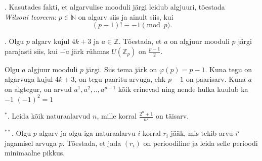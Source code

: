 \documentclass[a4paper, 10pt]{article}
\newcommand{\Z}{\mathbb{Z}}
\newcommand{\N}{\mathbb{N}}
\begin{document}
. Kasutades fakti, et algarvulise mooduli järgi leidub algjuuri, tõestada \\\emph{Wilsoni teoreem}:
$p\in\N$ on algarv siis ja ainult siis, kui 
$$
(p-1)!\equiv -1 \pmod{p}.
$$

\smallskip

. Olgu $p$ algarv kujul $4k+3$ ja $a\in\Z$. Tõestada, et $a$ on algjuur mooduli $p$ järgi parajasti siis, kui $\overline{-a}$ järk rühmas  $U(\Z_p)$ on $\frac{p-1}{2}$. 

\bigskip
Olgu $a$ algjuur mooduli $p$ järgi. Siis tema järk on $\varphi(p)=p-1$. Kuna tegu on algarvuga kujul $4k+3$, on tegu paaritu arvuga, ehk $p-1$ on paarisarv. Kuna $a$ on algtegur, on arvud $a^1,a^2,..,a^{p-1}$ kõik erinevad ning nende hulka kuulub ka $-1$  $(-1)^2=1$
\bigskip

${^*}$. Leida kõik naturaalarvud $n$, mille korral $\frac{2^n+1}{n^2}$ on täisarv. 

\bigskip

${^{**}}$. Olgu $p$ algarv ja olgu iga naturaalarvu $i$ korral $r_i$ jääk, mis tekib arvu $i^i$ jagamisel arvuga $p$. Tõestada, et jada $(r_i)$ on perioodiline ja leida selle perioodi minimaalne pikkus. 
\end{document}

